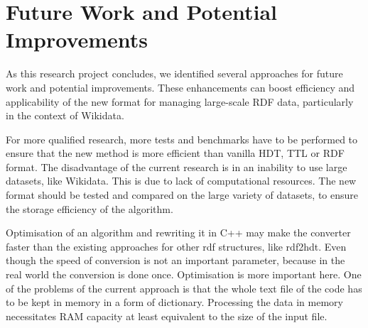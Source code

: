 






\section{Future Work and Potential Improvements}

As this research project concludes, we identified several approaches for future work and potential improvements. These enhancements can boost efficiency and applicability of the new format for managing large-scale RDF data, particularly in the context of Wikidata.

For more qualified research, more tests and benchmarks have to be performed to ensure that the new method is more efficient than vanilla HDT, TTL or RDF format. The disadvantage of the current research is in an inability to use large datasets, like Wikidata. This is due to lack of computational resources. The new format should be tested and compared on the large variety of datasets, to ensure the storage efficiency of the algorithm.

Optimisation of an algorithm and rewriting it in C++ may make the converter faster than the existing approaches for other rdf structures, like rdf2hdt. Even though the speed of conversion is not an important parameter, because in the real world the conversion is done once. Optimisation is more important here. One of the problems of the current approach is that the whole text file of the code has to be kept in memory in a form of dictionary. Processing the data in memory necessitates RAM capacity at least equivalent to the size of the input file.

